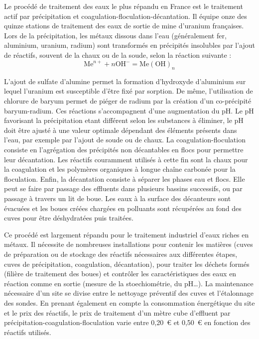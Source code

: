 \documentclass{article}
\begin{document}
Le procédé de traitement des eaux le plus répandu en France est le traitement actif par précipitation et coagulation-floculation-décantation. Il équipe onze des quinze stations de traitement des eaux de sortie de mine d'uranium françaises. 
Lors de la précipitation, les métaux dissous dans l’eau (généralement fer, aluminium, uranium, radium) sont transformés en précipités insolubles par l’ajout de réactifs, souvent de la chaux ou de la soude, selon la réaction suivante :   
$$\mathrm{Me}^{n+} + n\mathrm{OH}^- = \mathrm{Me(OH)}_{n}$$
          	
L’ajout de sulfate d’alumine permet la formation d’hydroxyde d’aluminium sur lequel l'uranium est susceptible d'être fixé par sorption. De même, l’utilisation de chlorure de baryum permet de piéger de radium par la création d’un co-précipité baryum-radium. Ces réactions s’accompagnent d’une augmentation du pH. Le pH favorisant la précipitation etant différent selon les substances à éliminer, le pH doit être ajusté à une valeur optimale dépendant des éléments présents dans l'eau, par exemple par l’ajout de soude ou de chaux. La coagulation-floculation consiste en l’agrégation des précipités non décantables en flocs  pour permettre leur décantation. Les réactifs couramment utilisés à cette fin sont la chaux pour la coagulation et les polymères organiques à longue chaîne carbonée pour la floculation. Enfin, la décantation consiste à séparer les phases eau et flocs. Elle peut se faire par passage des effluents dans plusieurs bassins successifs, ou par passage à travers un lit de boue. Les eaux à la surface des décanteurs sont évacuées et les boues créées chargées en polluants sont récupérées au fond des cuves pour être déshydratées puis traitées.

Ce procédé est largement répandu pour le traitement industriel d’eaux riches en métaux. Il nécessite de nombreuses installations pour contenir les matières (cuves de préparation ou de stockage des réactifs nécessaires aux différentes étapes, cuves de précipitation, coagulation, décantation), pour traiter les déchets formés (filière de traitement des boues) et contrôler les caractéristiques des eaux en réaction comme en sortie (mesure de la stoechiométrie, du pH…). La maintenance nécessaire d'un site se divise entre le nettoyage préventif des cuves et l'étalonnage des sondes. En prenant également en compte la consommation énergétique du site et le prix des réactifs, le prix de traitement d’un mètre cube d’effluent par précipitation-coagulation-floculation varie entre 0,20~\euro{} et 0,50~\euro{} en fonction des réactifs utilisés.
\end{document}
